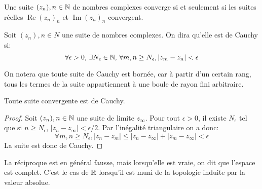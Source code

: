 \begin{prop}
Une suite $(z_n), n \in {\mathbb N}$ de nombres complexes converge si et seulement si les suites réelles $\operatorname{Re} (z_n)_n$ et $\operatorname{Im} (z_n)_n$ convergent.
\end{prop}
\begin{fdefn}
	Soit $(z_n),n \in N$ une suite de nombres complexes. On dira qu'elle est de Cauchy si:
	\[
	\forall \epsilon > 0, \, \exists N_\epsilon \in {\mathbb N}, \, \forall m,n \geq N_\epsilon, |z_m-z_n| < \epsilon
	\]
\end{fdefn}
On notera que toute suite de Cauchy est bornée, car à partir d'un certain rang, tous les termes de la suite appartiennent à une boule de rayon fini arbitraire. 
\begin{fprop}
	Toute suite convergente est de Cauchy.
\end{fprop}
\begin{proof}
	Soit $(z_n),n\in {\mathbb N}$ une suite de limite $z_\infty$. Pour tout $\epsilon > 0$, il existe $N_\epsilon$ tel que si $n \geq N_\epsilon$, $|z_n - z_\infty| < \epsilon / 2$. Par l'inégalité triangulaire on a donc:
	\[
	\forall m,n \geq N_\epsilon, |z_n -z_m| \leq |z_n - z_\infty| + |z_m - z_\infty| < \epsilon
	\]
	La suite est donc de Cauchy.
\end{proof}
La réciproque est en général fausse, mais lorsqu'elle est vraie, on dit que l'espace est complet. C'est le cas de $\mathbb R$ lorsqu'il est muni de la topologie induite par la valeur absolue. 

